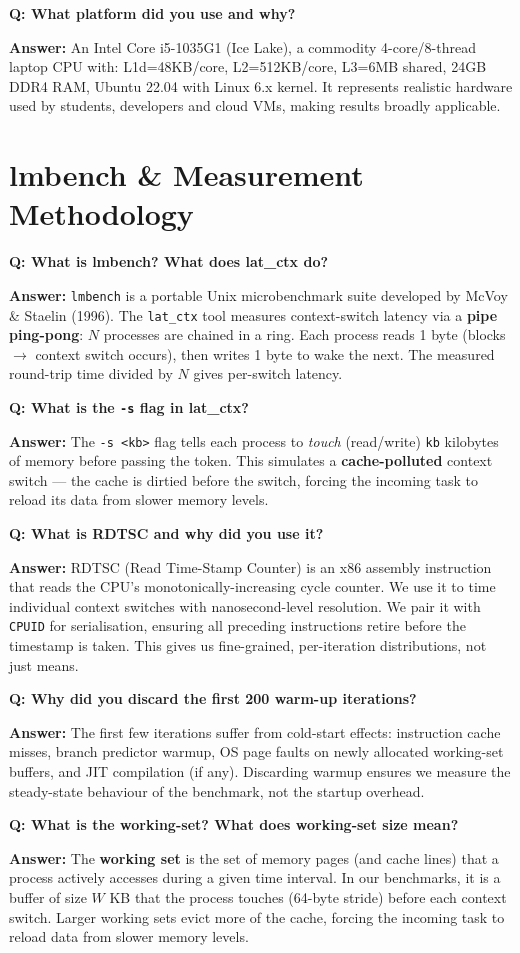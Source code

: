 \documentclass[12pt,a4paper]{article}
\newcommand{\Q}[1]{\begin{mdframed}[style=qbox]
\textbf{\textcolor{qcol}{Q: #1}}\end{mdframed}\vspace{2pt}}
\newcommand{\A}[1]{\begin{mdframed}[style=abox]
\textbf{\textcolor{acol}{Answer:}} #1\end{mdframed}\vspace{10pt}}
\begin{document}
\Q{What platform did you use and why?}
\A{An Intel Core i5-1035G1 (Ice Lake), a commodity 4-core/8-thread laptop CPU with: L1d=48KB/core, L2=512KB/core, L3=6MB shared, 24GB DDR4 RAM, Ubuntu 22.04 with Linux 6.x kernel. It represents realistic hardware used by students, developers and cloud VMs, making results broadly applicable.}

\section{lmbench \& Measurement Methodology}

\Q{What is lmbench? What does lat\_ctx do?}
\A{\texttt{lmbench} is a portable Unix microbenchmark suite developed by McVoy \& Staelin (1996). The \texttt{lat\_ctx} tool measures context-switch latency via a \textbf{pipe ping-pong}: $N$ processes are chained in a ring. Each process reads 1 byte (blocks $\rightarrow$ context switch occurs), then writes 1 byte to wake the next. The measured round-trip time divided by $N$ gives per-switch latency.}

\Q{What is the \texttt{-s} flag in lat\_ctx?}
\A{The \texttt{-s <kb>} flag tells each process to \textit{touch} (read/write) \texttt{kb} kilobytes of memory before passing the token. This simulates a \textbf{cache-polluted} context switch --- the cache is dirtied before the switch, forcing the incoming task to reload its data from slower memory levels.}

\Q{What is RDTSC and why did you use it?}
\A{RDTSC (Read Time-Stamp Counter) is an x86 assembly instruction that reads the CPU's monotonically-increasing cycle counter. We use it to time individual context switches with nanosecond-level resolution. We pair it with \texttt{CPUID} for serialisation, ensuring all preceding instructions retire before the timestamp is taken. This gives us fine-grained, per-iteration distributions, not just means.}

\Q{Why did you discard the first 200 warm-up iterations?}
\A{The first few iterations suffer from cold-start effects: instruction cache misses, branch predictor warmup, OS page faults on newly allocated working-set buffers, and JIT compilation (if any). Discarding warmup ensures we measure the steady-state behaviour of the benchmark, not the startup overhead.}

\Q{What is the working-set? What does working-set size mean?}
\A{The \textbf{working set} is the set of memory pages (and cache lines) that a process actively accesses during a given time interval. In our benchmarks, it is a buffer of size $W$ KB that the process touches (64-byte stride) before each context switch. Larger working sets evict more of the cache, forcing the incoming task to reload data from slower memory levels.}
\end{document}
